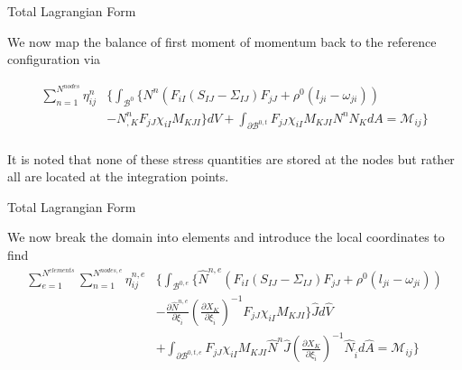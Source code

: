 \documentclass[11pt]{beamer}
\begin{document}
\begin{frame}{Total Lagrangian Form}

We now map the balance of first moment of momentum back to the reference configuration via

\begin{align*}
\sum_{n=1}^{N^{nodes}} \eta_{ij}^n &\bigg\{\int_{\mathcal{B}^{0}}  \bigg\{N^n\left(F_{iI} \left(S_{IJ}-\Sigma_{IJ}\right) F_{jJ} + \rho^0\left(l_{ji} - \omega_{ji} \right)\right)\\
&  - N_{,K}^n F_{jJ} \chi_{iI}  M_{KJI} \bigg\} dV + \int_{\partial \mathcal{B}^{0,t}} F_{jJ} \chi_{iI}  M_{KJI} N^n N_{K} dA = \mathcal{M}_{ij}\bigg\}\\
\end{align*}

It is noted that none of these stress quantities are stored at the nodes but rather all are located at the integration points.

\end{frame}

\begin{frame}{Total Lagrangian Form}

We now break the domain into elements and introduce the local coordinates to find
\begin{align*}
\sum_{e=1}^{N^{elements}}\sum_{n=1}^{N^{nodes,e}} \eta_{ij}^{n,e} &\bigg\{\int_{\mathcal{B}^{0,e}}  \bigg\{\hat{N}^{n,e} \left(F_{iI} \left(S_{IJ}-\Sigma_{IJ}\right) F_{jJ} + \rho^0\left(l_{ji} - \omega_{ji} \right)\right)\\
&  - \frac{\partial \hat{N}^{n,e}}{\partial \xi_{\hat{i}}} \left(\frac{\partial X_{K}}{\partial \xi_{\hat{i}}}\right)^{-1} F_{jJ} \chi_{iI}  M_{KJI} \bigg\} \hat{J} d\hat{V}\\
& + \int_{\partial \mathcal{B}^{0,t,e}} F_{jJ} \chi_{iI}  M_{KJI} \hat{N}^n \hat{J} \left(\frac{\partial X_{K}}{\partial \xi_{\hat{i}}}\right)^{-1} \hat{N}_{\hat{i}} d\hat{A} = \mathcal{M}_{ij} \bigg\}\\
\end{align*}

\end{frame}
\end{document}
